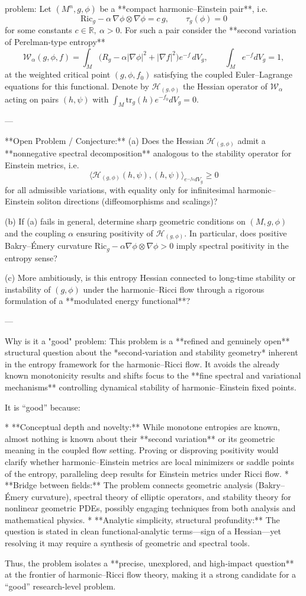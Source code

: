 problem:  
Let \((M^n,g,\phi)\) be a **compact harmonic–Einstein pair**, i.e. 
\[
\mathrm{Ric}_g-\alpha\,\nabla \phi\otimes\nabla\phi=c\,g,\qquad \tau_g(\phi)=0
\]
for some constants \(c\in\mathbb R,\ \alpha>0\).  
For such a pair consider the **second variation of Perelman-type entropy** 
\[
\mathcal{W}_\alpha(g,\phi,f)
=\int_M \bigl(R_g-\alpha|\nabla \phi|^2+|\nabla f|^2\bigr)e^{-f}\,dV_g,
\qquad \int_M e^{-f}dV_g=1,
\]
at the weighted critical point \((g,\phi,f_0)\) satisfying the coupled Euler–Lagrange equations for this functional.
Denote by \(\mathcal H_{(g,\phi)}\) the Hessian operator of \(\mathcal{W}_\alpha\) acting on pairs \((h,\psi)\) with \(\int_M \mathrm{tr}_g(h)e^{-f_0}dV_g=0\).

---

**Open Problem / Conjecture:**  
(a) Does the Hessian \(\mathcal H_{(g,\phi)}\) admit a **nonnegative spectral decomposition** analogous to the stability operator for Einstein metrics, i.e.
\[
\langle \mathcal H_{(g,\phi)}(h,\psi),(h,\psi)\rangle_{e^{-f_0}dV_g}\ge0
\]
for all admissible variations, with equality only for infinitesimal harmonic–Einstein soliton directions (diffeomorphisms and scalings)?  

(b) If (a) fails in general, determine sharp geometric conditions on \((M,g,\phi)\) and the coupling \(\alpha\) ensuring positivity of \(\mathcal H_{(g,\phi)}\).
In particular, does positive Bakry–Émery curvature  
\(\mathrm{Ric}_g-\alpha\nabla \phi\otimes\nabla \phi>0\)  
imply spectral positivity in the entropy sense?  

(c) More ambitiously, is this entropy Hessian connected to long-time stability or instability of \((g,\phi)\) under the harmonic–Ricci flow through a rigorous formulation of a **modulated energy functional**?

---

Why is it a "good" problem:  
This problem is a **refined and genuinely open** structural question about the *second‑variation and stability geometry* inherent in the entropy framework for the harmonic–Ricci flow.  
It avoids the already known monotonicity results and shifts focus to the **fine spectral and variational mechanisms** controlling dynamical stability of harmonic–Einstein fixed points.  

It is “good” because:

* **Conceptual depth and novelty:** While monotone entropies are known, almost nothing is known about their **second variation** or its geometric meaning in the coupled flow setting. Proving or disproving positivity would clarify whether harmonic–Einstein metrics are local minimizers or saddle points of the entropy, paralleling deep results for Einstein metrics under Ricci flow.
* **Bridge between fields:** The problem connects geometric analysis (Bakry–Émery curvature), spectral theory of elliptic operators, and stability theory for nonlinear geometric PDEs, possibly engaging techniques from both analysis and mathematical physics.  
* **Analytic simplicity, structural profundity:** The question is stated in clean functional‑analytic terms—sign of a Hessian—yet resolving it may require a synthesis of geometric and spectral tools.  

Thus, the problem isolates a **precise, unexplored, and high‑impact question** at the frontier of harmonic–Ricci flow theory, making it a strong candidate for a “good” research-level problem.